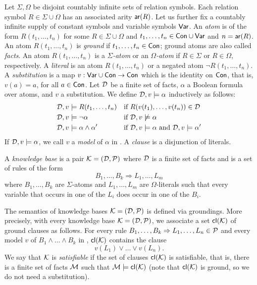 \documentclass[conference]{IEEEtran}
\begin{document}
Let $\Sigma,\Omega$ be disjoint countably infinite sets of relation
symbols.  Each relation symbol $R\in \Sigma\cup\Omega$ has an
associated arity $\mathsf{ar}(R)$.  Let us further fix a countably
infinite supply of constant symbols  and variable symbols
$\mathsf{Var}$.  An \emph{atom} is of the form $R(t_1,\ldots,t_n)$ for
some $R\in \Sigma\cup\Omega$ and
$t_1,\ldots,t_n\in\mathsf{Con}\cup\mathsf{Var}$ and $n=\mathsf{ar}(R)$. An atom
$R(t_1,\ldots,t_n)$ is \emph{ground} if $t_1,\ldots,t_n\in\mathsf{Con}$;
ground atoms are also called \emph{facts}. An atom $R(t_1,\ldots,t_n)$
is a \emph{$\Sigma$-atom} or an \emph{$\Omega$-atom} if $R\in \Sigma$
or $R\in \Omega$, respectively. A \emph{literal} is an atom
$R(t_1,\ldots,t_n)$ or a negated atom $\neg R(t_1,\ldots,t_n)$.
A \emph{substitution} is a map
$v:\mathsf{Var}\cup\mathsf{Con}\to\mathsf{Con}$ which is the identity on
$\mathsf{Con}$, that is, $v(a)=a$, for all $a\in\mathsf{Con}$. Let $\mathcal{D}$ be
a finite set of facts, $\alpha$ a Boolean formula over atoms, and
$v$ a substitution. We define $\mathcal{D},v\models \alpha$ inductively as
follows: 
%
\begin{align*}
  \mathcal{D},v & \models R(t_1,\ldots,t_n) && \text{if
  $R(v(t_1),\ldots,v(t_n))\in \mathcal{D}$} \\
  \mathcal{D}, v& \models \neg \alpha && \text{if $\mathcal{D},v\not\models \alpha$}
  \\
  \mathcal{D}, v& \models \alpha \wedge \alpha' && \text{if $\mathcal{D},v\models
  \alpha$ and $\mathcal{D},v\models\alpha'$}
\end{align*}
%
If $\mathcal{D},v\models\alpha$, we call $v$ a \emph{model} of $\alpha$ in
\Dmc. A \emph{clause} is a disjunction of literals.


A \emph{\bcore knowledge base} is a pair $\mathcal{K}=(\mathcal{D},\mathcal{P})$ where $\mathcal{D}$ is a
finite set of facts and \Pmc is a set of rules of the form 
%
\[B_1, \ldots, B_k \Rightarrow L_1, \ldots, L_m\]
%
where $B_1,\ldots,B_k$ are $\Sigma$-atoms
and $L_1,\ldots,L_m$ are $\Omega$-literals such that every variable
that occurs in one of the $L_i$ does occur in one of the 
$B_i$.

The semantics of \bcore knowledge bases $\mathcal{K}=(\mathcal{D},\mathcal{P})$ is defined via
groundings. More precisely, with every \bcore knowledge
base $\mathcal{K}=(\mathcal{D},\mathcal{P})$, we associate a set 
$\mathsf{cl}(\mathcal{K})$ of ground clauses as follows.
For every rule $B_1,\ldots,B_k \Rightarrow L_1,\ldots, L_n\in\mathcal{P}$ and every
model $v$ of $B_1\wedge\ldots\wedge B_k$ in \Dmc, $\mathsf{cl}(\mathcal{K})$ contains the clause
%
\[v(L_1)\vee\ldots\vee v(L_n).\]
%
We say that $\mathcal{K}$ is \emph{satisfiable} if the set of clauses
$\mathsf{cl}(\mathcal{K})$ is satisfiable, that is, there is a finite set of
facts $\mathcal{M}$ such that $\mathcal{M}\models\mathsf{cl}(\mathcal{K})$ (note that
$\mathsf{cl}(\mathcal{K})$ is ground, so we do not need a substitution).
\end{document}
